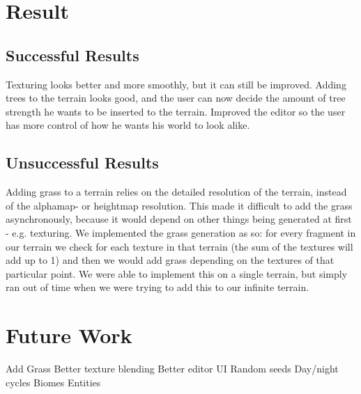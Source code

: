 \documentclass{article}
\begin{document}
\section{Result}
\label{sec:result}

\subsection{Successful Results}
\label{subsec:success}
Texturing looks better and more smoothly, but it can still be improved.
Adding trees to the terrain looks good, and the user can now decide the amount of tree strength he wants to be inserted to the terrain.
Improved the editor so the user has more control of how he wants his world to look alike.

\subsection{Unsuccessful Results}
\label{subsec:unsuccess}
Adding grass to a terrain relies on the detailed resolution of the terrain, instead of the alphamap- or heightmap resolution. This made it difficult to add the grass asynchronously, because it would depend on other things being generated at first - e.g. texturing. We implemented the grass generation as so: for every fragment in our terrain we check for each texture in that terrain (the sum of the textures will add up to 1) and then we would add grass depending on the textures of that particular point.
We were able to implement this on a single terrain, but simply ran out of time when we were trying to add this to our infinite terrain.

\section{Future Work}
\label{sec:future}
Add Grass
Better texture blending
Better editor UI
Random seeds
Day/night cycles
Biomes
Entities



\end{document}
